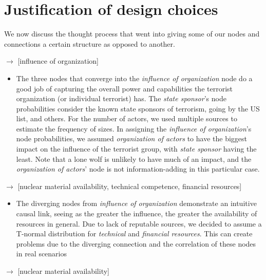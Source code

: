 \documentclass{article}
\begin{document}
{\section{Justification of design choices}
We now discuss the thought process that went into giving some of our nodes and connections a certain structure as opposed to another. 

 $\longrightarrow$ [influence of organization]

\begin{itemize}
    \item     The three nodes that converge into the \textit{influence of organization} node do a good job of capturing the overall power and capabilities the terrorist organization (or individual terrorist) has. The \textit{state sponsor}’s node probabilities consider the known state sponsors of terrorism, going by the US list, and others\cite{StateSponsorsTerrorism}\cite{StatesponsoredTerrorism2020}. For the number of actors, we used multiple sources to estimate the frequency of sizes\cite{PickYourPOICN}\cite{nesserResearchNoteSingle2012}. In assigning the \textit{influence of organization}’s node probabilities, we assumed \textit{organization of actors} to have the biggest impact on the influence of the terrorist group, with \textit{state sponsor} having the least. Note that a lone wolf is unlikely to have much of an impact, and the \textit{organization of actors}’ node is not information-adding in this particular case.  
\end{itemize}

 $\longrightarrow$ [nuclear material availability, technical competence, financial resources] 

\begin{itemize}
    \item  The diverging nodes from \textit{influence of organization} demonstrate an intuitive causal link, seeing as the greater the influence, the greater the availability of resources in general. Due to lack of reputable sources, we decided to assume a T-normal distribution for \textit{technical} and \textit{financial resources}. This can create problems due to the diverging connection and the correlation of these nodes in real scenarios 
\end{itemize}

 $\longrightarrow$ [nuclear material availability] 

}
\end{document}
